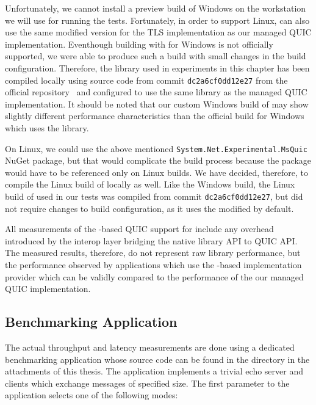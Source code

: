 Unfortunately, we cannot install a preview build of Windows on the workstation we will use for
running the tests. Fortunately, in order to support Linux, \libmsquic{} can also use the same
modified \libopenssl{} version for the TLS implementation as our managed QUIC implementation.
Eventhough building \libmsquic{} with \libopenssl{} for Windows is not officially supported, we were
able to produce such a build with small changes in the \libmsquic{} build configuration. Therefore,
the \libmsquic{} library used in experiments in this chapter has been compiled locally using source
code from commit \texttt{dc2a6cf0dd12e27} from the official \libmsquic{}
repository~\cite{msquicGithub} and configured to use the same \libopenssl{} library as the managed
QUIC implementation. It should be noted that our custom Windows build of \libmsquic{} may show
slightly different performance characteristics than the official build for Windows which uses the
\libschannel{} library.

On Linux, we could use the above mentioned
\texttt{System.Net\allowbreak{}.Experimental.\allowbreak{}MsQuic} NuGet package, but that would
complicate the build process because the package would have to be referenced only on Linux builds.
We have decided, therefore, to compile the Linux build of \libmsquic{} locally as well. Like the
Windows build, the Linux build of \libmsquic{} used in our tests was compiled from commit
\texttt{dc2a6cf0dd12e27}, but did not require changes to build configuration, as it uses the
modified \libopenssl{} by default.

All measurements of the \libmsquic{}-based QUIC support for \dotnet{} include any overhead
introduced by the interop layer bridging the native library API to \dotnet{} QUIC API\@. The
measured results, therefore, do not represent raw \libmsquic{} library performance, but the
performance observed by \dotnet{} applications which use the \libmsquic{}-based implementation
provider which can be validly compared to the performance of the our managed QUIC implementation.

\subsection{Benchmarking Application}\label{sec:04-benchmark-app}

The actual throughput and latency measurements are done using a dedicated benchmarking \dotnet{}
application whose source code can be found in the
 directory in the attachments of this thesis.
The application implements a trivial echo server and clients which exchange messages of specified
size. The first parameter to the application selects one of the following modes:

